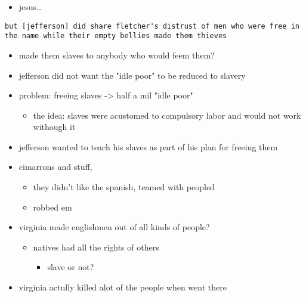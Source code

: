 \documentclass[letterpaper]{article}
\begin{document}
\begin{itemize}
\begin{itemize}
\begin{itemize}
\item jesus\ldots{}
\end{itemize}
\end{itemize}
\end{itemize}

\begin{verbatim}
but [jefferson] did share fletcher's distrust of men who were free in the name while their empty bellies made them thieves
\end{verbatim}

\begin{itemize}
\item made them slaves to anybody who would feem them?

\item jefferson did not want the "idle poor" to be reduced to slavery

\item problem: freeing slaves -> half a mil "idle poor"

\begin{itemize}
\item the idea: slaves were acustomed to compulsory labor and would not
work withough it
\end{itemize}

\item jefferson wanted to teach his slaves as part of his plan for freeing
them

\item cimarrons and stuff,

\begin{itemize}
\item they didn't like the spanish, teamed with peopled
\item robbed em
\end{itemize}

\item virginia made englishmen out of all kinds of people?

\begin{itemize}
\item natives had all the rights of others

\begin{itemize}
\item slave or not?
\end{itemize}
\end{itemize}

\item virginia actully killed alot of the people when went there


\end{itemize}
\end{document}
